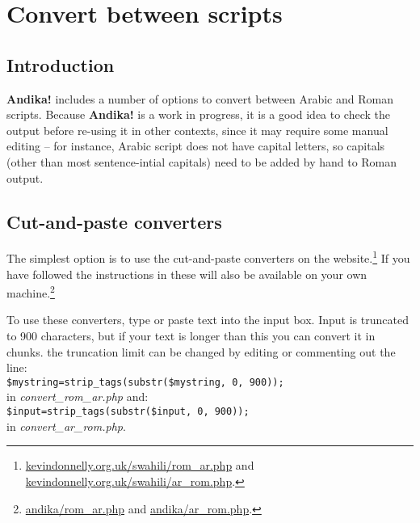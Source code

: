 \documentclass[a4paper,10pt, oneside]{book}
\begin{document}
\frenchspacing

% 

% 

% 

% 

% 

% 

% 



\chapter{Convert between scripts}

\section{Introduction}

\textbf{Andika!} includes a number of options to convert between Arabic and Roman scripts.  Because \textbf{Andika!} is a work in progress, it is a good idea to check the output before re-using it in other contexts, since it may require some manual editing -- for instance, Arabic script does not have capital letters, so capitals (other than most sentence-intial capitals) need to be added by hand to Roman output.

\section{Cut-and-paste converters}

The simplest option is to use the cut-and-paste converters on the website.\footnote{\url{kevindonnelly.org.uk/swahili/rom_ar.php} and \url{kevindonnelly.org.uk/swahili/ar_rom.php}.}  If you have followed the instructions in  these will also be available on your own machine.\footnote{\url{andika/rom_ar.php} and \url{andika/ar_rom.php}.}

To use these converters, type or paste text into the input box.  Input is truncated to 900 characters, but if your text is longer than this you can convert it in chunks.  the truncation limit can be changed by editing or commenting out the line: \\
\verb|$mystring=strip_tags(substr($mystring, 0, 900));| \\
in \textit{convert\_rom\_ar.php} and: \\
\verb|$input=strip_tags(substr($input, 0, 900));| \\
in \textit{convert\_ar\_rom.php}.
\end{document}
